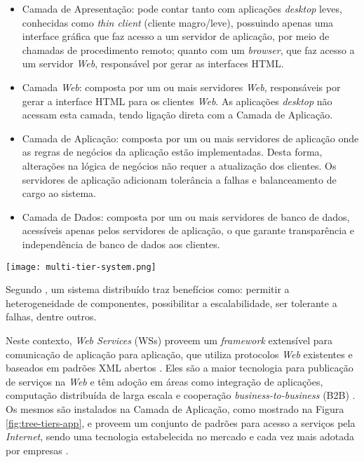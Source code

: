 \begin{itemize}
	\item Camada de Apresentação: pode contar tanto com aplicações \textit{desktop} leves, conhecidas como \textit{thin client} (cliente magro/leve),
  possuindo apenas uma interface gráfica que faz acesso a um servidor de aplicação, por meio de chamadas de procedimento remoto; quanto com um \textit{browser}, que faz acesso a um servidor \textit{Web}, responsável por gerar as interfaces HTML.
  \item Camada \textit{Web}: composta por um ou mais servidores \textit{Web}, responsáveis por gerar a interface HTML para os clientes \textit{Web}. As aplicações \textit{desktop} não acessam esta camada, tendo ligação direta com a Camada de Aplicação. 
  \item Camada de Aplicação: composta por um ou mais servidores de aplicação onde as regras de negócios da aplicação estão implementadas. Desta forma, alterações na lógica de negócios não requer a atualização dos clientes. Os servidores de aplicação adicionam tolerância a falhas e balanceamento de cargo ao sistema.
  \item Camada de Dados: composta por um ou mais servidores de banco de dados, acessíveis apenas pelos servidores de aplicação, o que garante transparência e independência de banco de dados aos clientes.
\end{itemize}

\begin{center}
	\texttt{[image: multi-tier-system.png]}
	\label{fig:tree-tiers-app}
\end{center}

Segundo \cite{coulouris2007sisdist}, um sistema distribuído traz benefícios como: permitir a heterogeneidade de componentes,
possibilitar a escalabilidade, ser tolerante a falhas, dentre outros.

Neste contexto, \textit{Web Services} (WSs) proveem um \textit{framework} extensível para comunicação de aplicação para aplicação, que utiliza protocolos \textit{Web} existentes e baseados em padrões XML abertos \cite{curbera2002unraveling}. Eles são a maior tecnologia para publicação de serviços na \textit{Web} e têm  adoção em áreas como integração de aplicações, computação distribuída de larga escala e cooperação \textit{business-to-business} (B2B) \cite{kopecky2008semantic}. Os mesmos são instalados na Camada de Aplicação, como mostrado na Figura \ref{fig:tree-tiers-app}, e proveem um conjunto de padrões para acesso a serviços pela \textit{Internet}, sendo uma tecnologia estabelecida no mercado e cada vez mais adotada por empresas \cite{lausen2007finding}.

